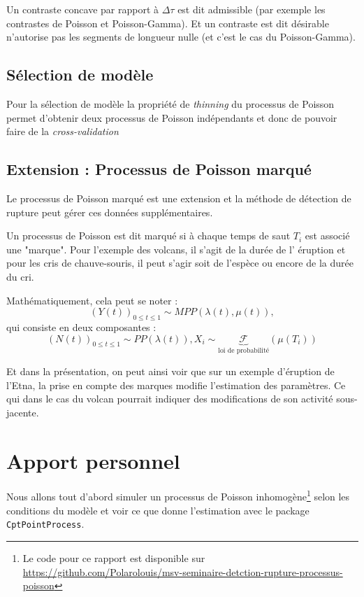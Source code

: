 \documentclass[a4paper,10pt]{article}\usepackage[]{graphicx}\usepackage[]{xcolor}
\begin{document}
Un contraste concave par rapport à $\Delta\tau$ est dit admissible (par exemple
les contrastes de Poisson et Poisson-Gamma). Et un contraste est dit désirable
n'autorise pas les segments de longueur nulle (et c'est le cas du 
Poisson-Gamma).

\subsection{Sélection de modèle}

Pour la sélection de modèle la propriété de \emph{thinning} du processus de 
Poisson permet d'obtenir deux processus de Poisson indépendants et donc 
de pouvoir faire de la \emph{cross-validation}

\subsection{Extension : Processus de Poisson marqué}

Le processus de Poisson marqué est une extension et la méthode de détection de
rupture peut gérer ces données supplémentaires.

Un processus de Poisson est dit marqué si à chaque temps de saut $T_i$ est 
associé une "marque". Pour l'exemple des volcans, il s'agit de la durée de l'
éruption et pour les cris de chauve-souris, il peut s'agir soit de l'espèce ou 
encore de la durée du cri.

Mathématiquement, cela peut se noter : 
$$(Y(t))_{0\leq t \leq 1} \sim MPP(\lambda(t), \mu(t)),$$ 
qui consiste en deux composantes :
$$(N(t))_{0\leq t \leq 1} \sim PP(\lambda(t)), X_i \sim \underbrace{\mathcal{F}}_{\text{loi de probabilité}}(\mu(T_i))$$

Et dans la présentation, on peut ainsi voir que sur un exemple d'éruption de 
l'Etna, la prise en compte des marques modifie l'estimation des paramètres. Ce 
qui dans le cas du volcan pourrait indiquer des modifications de son activité
sous-jacente.

\section{Apport personnel}



Nous allons tout d'abord simuler un processus de Poisson inhomogène\footnote{Le 
code pour ce rapport est disponible sur 
\url{https://github.com/Polarolouis/msv-seminaire-detction-rupture-processus-poisson}} selon les 
conditions du modèle et voir ce que donne l'estimation avec le package 
\texttt{CptPointProcess}.
\end{document}
